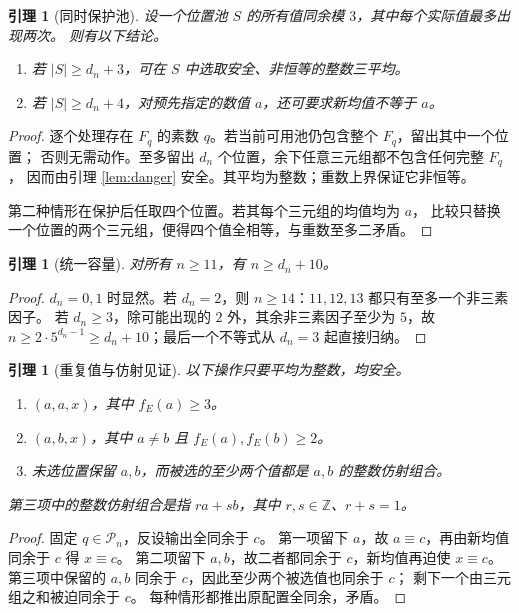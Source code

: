 \documentclass[UTF8,fontset=fandol,zihao=-4,a4paper]{ctexart}
\numberwithin{equation}{section}
\newtheorem{lemma}[theorem]{引理}
\theoremstyle{definition}
\newcommand{\Z}{\mathbb Z}
\newcommand{\PP}{\mathcal P}
\begin{document}
\begin{lemma}[同时保护池]\label{lem:pool}
设一个位置池 $S$ 的所有值同余模 $3$，其中每个实际值最多出现两次。
则有以下结论。
\begin{enumerate}
\item 若 $|S|\ge d_n+3$，可在 $S$ 中选取安全、非恒等的整数三平均。
\item 若 $|S|\ge d_n+4$，对预先指定的数值 $a$，还可要求新均值不等于 $a$。
\end{enumerate}
\end{lemma}
\begin{proof}
逐个处理存在 $F_q$ 的素数 $q$。若当前可用池仍包含整个 $F_q$，留出其中一个位置；
否则无需动作。至多留出 $d_n$ 个位置，余下任意三元组都不包含任何完整 $F_q$，
因而由引理 \ref{lem:danger} 安全。其平均为整数；重数上界保证它非恒等。

第二种情形在保护后任取四个位置。若其每个三元组的均值均为 $a$，
比较只替换一个位置的两个三元组，便得四个值全相等，与重数至多二矛盾。
\end{proof}

\begin{lemma}[统一容量]\label{lem:capacity}
对所有 $n\ge11$，有 $n\ge d_n+10$。
\end{lemma}
\begin{proof}
$d_n=0,1$ 时显然。若 $d_n=2$，则 $n\ge14$：$11,12,13$ 都只有至多一个非三素因子。
若 $d_n\ge3$，除可能出现的 $2$ 外，其余非三素因子至少为 $5$，故
$n\ge2\cdot5^{d_n-1}\ge d_n+10$；最后一个不等式从 $d_n=3$ 起直接归纳。
\end{proof}

\begin{lemma}[重复值与仿射见证]\label{lem:repeated-safety}
以下操作只要平均为整数，均安全。
\begin{enumerate}
\item $(a,a,x)$，其中 $f_E(a)\ge3$。
\item $(a,b,x)$，其中 $a\ne b$ 且 $f_E(a),f_E(b)\ge2$。
\item 未选位置保留 $a,b$，而被选的至少两个值都是 $a,b$ 的整数仿射组合。
\end{enumerate}
第三项中的整数仿射组合是指 $ra+sb$，其中 $r,s\in\Z$、$r+s=1$。
\end{lemma}
\begin{proof}
固定 $q\in\PP_n$，反设输出全同余于 $c$。
第一项留下 $a$，故 $a\equiv c$，再由新均值同余于 $c$ 得 $x\equiv c$。
第二项留下 $a,b$，故二者都同余于 $c$，新均值再迫使 $x\equiv c$。
第三项中保留的 $a,b$ 同余于 $c$，因此至少两个被选值也同余于 $c$；
剩下一个由三元组之和被迫同余于 $c$。
每种情形都推出原配置全同余，矛盾。
\end{proof}
\end{document}
